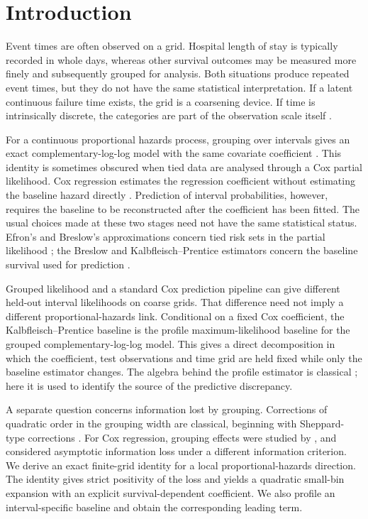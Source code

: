 \documentclass[smallextended,natbib]{svjour3}
\begin{document}
\section{Introduction}
\label{sec:introduction}

Event times are often observed on a grid. Hospital length of stay is typically recorded in whole days, whereas other survival outcomes may be measured more finely and subsequently grouped for analysis. Both situations produce repeated event times, but they do not have the same statistical interpretation. If a latent continuous failure time exists, the grid is a coarsening device. If time is intrinsically discrete, the categories are part of the observation scale itself \citep{tutz2016,nawata2009}.

For a continuous proportional hazards process, grouping over intervals gives an exact complementary-log-log model with the same covariate coefficient \citep{prentice1978}. This identity is sometimes obscured when tied data are analysed through a Cox partial likelihood. Cox regression estimates the regression coefficient without estimating the baseline hazard directly \citep{cox1972,andersen1993}. Prediction of interval probabilities, however, requires the baseline to be reconstructed after the coefficient has been fitted. The usual choices made at these two stages need not have the same statistical status. Efron's and Breslow's approximations concern tied risk sets in the partial likelihood \citep{breslow1974,efron1977}; the Breslow and Kalbfleisch--Prentice estimators concern the baseline survival used for prediction \citep{kalbfleisch1973,prentice2003,xia2018}.

Grouped likelihood and a standard Cox prediction pipeline can give different held-out interval likelihoods on coarse grids. That difference need not imply a different proportional-hazards link. Conditional on a fixed Cox coefficient, the Kalbfleisch--Prentice baseline is the profile maximum-likelihood baseline for the grouped complementary-log-log model. This gives a direct decomposition in which the coefficient, test observations and time grid are held fixed while only the baseline estimator changes. The algebra behind the profile estimator is classical \citep{kalbfleisch1973,allison1982}; here it is used to identify the source of the predictive discrepancy.

A separate question concerns information lost by grouping. Corrections of quadratic order in the grouping width are classical, beginning with Sheppard-type corrections \citep{sheppard1897}. For Cox regression, grouping effects were studied by \citet{mckeague1994,mckeague1996}, and \citet{felsenstein1998} considered asymptotic information loss under a different information criterion. We derive an exact finite-grid identity for a local proportional-hazards direction. The identity gives strict positivity of the loss and yields a quadratic small-bin expansion with an explicit survival-dependent coefficient. We also profile an interval-specific baseline and obtain the corresponding leading term.
\end{document}
